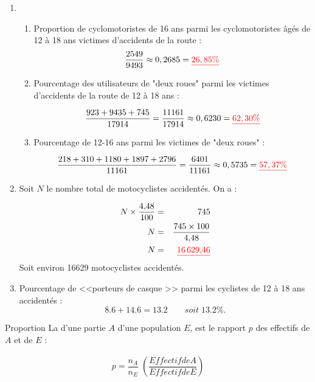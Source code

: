 \documentclass[12pt,a4paper]{article}
\begin{document}
\begin{enumerate}[label=\arabic*.]
	\item 
	\begin{enumerate} [label=\alph*) ]
		\item Proportion de cyclomotoristes de 16 ans parmi les cyclomotoristes âgés de 12 à 18 ans victimes d'accidents de la route :
			\begin{eqnarray*}
				\dfrac{2549}{9493} \approx 0,2685 = \textcolor{red}{\underline{26,85\%}}
			\end{eqnarray*}
			
		\item Pourcentage des utilisateurs de "deux roues" parmi les victimes d'accidents de la route de 12 à 18 ans :
		
			\begin{equation*}
				\dfrac{923 + 9435 + 745}{17914} = \dfrac{11 161}{17914} \approx 0,6230 = \textcolor{red}{\underline{62,30 \%}}
			\end{equation*}
			
		\item Pourcentage de 12-16 ans parmi les victimes de "deux roues" :
		
			\begin{equation*}
				\dfrac{218 + 310 + 1180 + 1897 + 2796}{11161} = \dfrac{6401}{11161} \approx 0,5735 = \textcolor{red}{\underline{57,37 \%}}
			\end{equation*}
	\end{enumerate}

	\item Soit $N$ le nombre total de motocyclistes accidentés. On a :
	
		\begin{eqnarray*}
			N \times \dfrac{\num{4.48}}{100} &=& 745 \\
			N &=& \dfrac{745 \times 100}{\num{4.48}} \\
			N &=&  \textcolor{red}{\underline{\num{16629.46}}}
		\end{eqnarray*}
	Soit environ \num{16629} motocyclistes accidentés.
	
	\item Pourcentage de <<porteurs de casque >> parmi les cyclistes de 12 à 18 ans accidentés :
	\begin{equation*}
		\num{8.6} + \num{14.6} = \num{13.2} \qquad soit \; \num{13.2}\%.
	\end{equation*}
\end{enumerate}

 \begin{mybilan2}{Proportion}
		La  d'une partie $A$ d'une population $E$, est le rapport $p$ des effectifs de $A$ et de $E$ :
		
		\begin{eqnarray*}
			p = \dfrac{n_A}{n_E} \; \left(\dfrac{Effectif de A}{Effectif de E}\right)
		\end{eqnarray*}
	\end{mybilan2}
\end{document}
